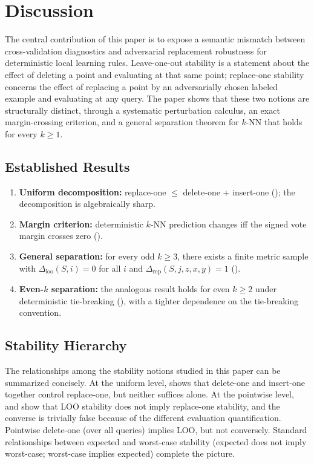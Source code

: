 \section{Discussion}
\label{sec:discussion}

The central contribution of this paper is to expose a semantic mismatch between
cross-validation diagnostics and adversarial replacement robustness for
deterministic local learning rules. Leave-one-out stability is a statement about
the effect of deleting a point and evaluating at that same point; replace-one
stability concerns the effect of replacing a point by an adversarially chosen
labeled example and evaluating at any query. The paper shows that these two
notions are structurally distinct, through a systematic perturbation calculus,
an exact margin-crossing criterion, and a general separation theorem for $k$-NN
that holds for every $k \ge 1$.

\subsection{Established Results}

\begin{enumerate}[leftmargin=*,label=(\arabic*)]
    \item \textbf{Uniform decomposition:} replace-one $\le$ delete-one +
        insert-one (); the decomposition is algebraically sharp.
    \item \textbf{Margin criterion:} deterministic $k$-NN prediction changes iff
        the signed vote margin crosses zero ().
    \item \textbf{General separation:} for every odd $k \ge 3$, there exists a
        finite metric sample with $\Delta_{\mathrm{loo}}(S,i)=0$ for all $i$ and
        $\Delta_{\mathrm{rep}}(S,j,z,x,y)=1$ ().
    \item \textbf{Even-$k$ separation:} the analogous result holds for even
        $k \ge 2$ under deterministic tie-breaking
        (), with a tighter dependence on the
        tie-breaking convention.
\end{enumerate}

\subsection{Stability Hierarchy}

The relationships among the stability notions studied in this paper can be
summarized concisely. At the uniform level,  shows that
delete-one and insert-one together control replace-one, but neither suffices
alone. At the pointwise level,  and
 show that LOO stability does not imply replace-one
stability, and the converse is trivially false because of the different
evaluation quantification. Pointwise delete-one (over all queries) implies LOO,
but not conversely. Standard relationships between expected and worst-case
stability (expected does not imply worst-case; worst-case implies expected)
complete the picture.

